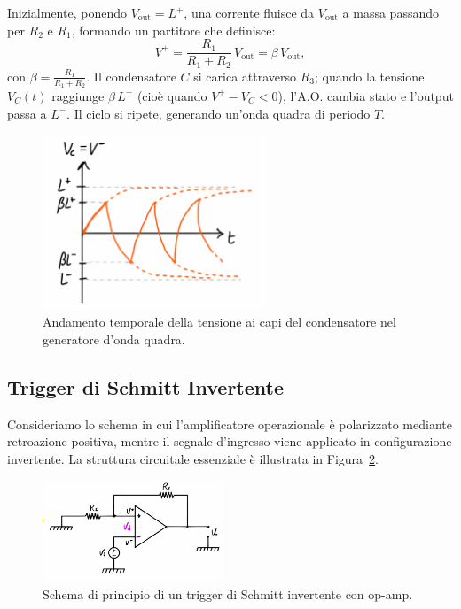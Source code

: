 Inizialmente, ponendo \(V_{\text{out}} = L^+\), una corrente fluisce da \(V_{\text{out}}\) a massa passando per \(R_2\) e \(R_1\), formando un partitore che definisce:
\[
V^+ = \frac{R_1}{R_1+R_2}\, V_{\text{out}} = \beta\, V_{\text{out}},
\]
con \(\beta = \frac{R_1}{R_1+R_2}\). Il condensatore \(C\) si carica attraverso \(R_3\); quando la tensione \(V_C(t)\) raggiunge \( \beta\, L^+\) (cioè quando \(V^+ - V_C < 0\)), l’A.O. cambia stato e l’output passa a \(L^-\). Il ciclo si ripete, generando un’onda quadra di periodo \(T\).\\[2mm]
\begin{figure}[H]
    \centering
    \includegraphics[width=0.6\textwidth]{images/1.6.2.2.png}
    \caption{Andamento temporale della tensione ai capi del condensatore nel generatore d’onda quadra.}
    \label{fig:onda_quad_temp}
\end{figure}
\newpage

\subsection{Trigger di Schmitt Invertente}

Consideriamo lo schema in cui l'amplificatore operazionale è polarizzato mediante retroazione positiva, mentre il segnale d'ingresso viene applicato in configurazione invertente. La struttura circuitale essenziale è illustrata in Figura~\ref{fig:schmitt_invertente}.\\[2mm]
\begin{figure}[H]
  \centering
  \includegraphics[width=0.48\textwidth]{images/1.6.3.1.png}
  \caption{Schema di principio di un trigger di Schmitt invertente con op-amp.}
  \label{fig:schmitt_invertente}
\end{figure}

